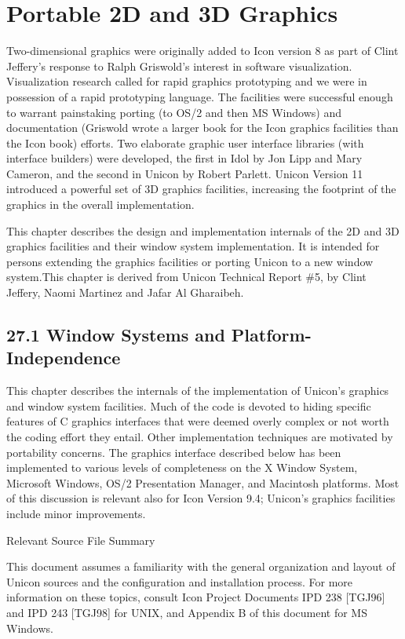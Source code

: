 \chapter{Portable 2D and 3D Graphics}

Two-dimensional graphics were originally added to Icon version 8 as
part of Clint Jeffery's response to Ralph Griswold's interest in
software visualization. Visualization research called for rapid
graphics prototyping and we were in possession of a rapid prototyping
language. The facilities were successful enough to warrant painstaking
porting (to OS/2 and then MS Windows) and documentation (Griswold wrote
a larger book for the Icon graphics facilities than the Icon book) efforts.
Two elaborate graphic user interface libraries (with interface
builders) were developed, the first in Idol by Jon Lipp and Mary
Cameron, and the second in Unicon by Robert Parlett.
Unicon Version 11 introduced a powerful set of 3D graphics facilities,
increasing the footprint of the graphics in the overall implementation.

This chapter describes the design and implementation internals of the
2D and 3D graphics facilities and their window system
implementation. It is intended for persons extending the graphics
facilities or porting Unicon to a new window system.This chapter is
derived from Unicon Technical Report \#5, by Clint Jeffery, Naomi
Martinez and Jafar Al Gharaibeh.


\section[27.1 Window Systems and Platform-Independence]{27.1 Window Systems and Platform-Independence}

This chapter describes the internals of the implementation of Unicon's
graphics and window system facilities. Much of the code is devoted to
hiding specific features of C graphics interfaces that were deemed
overly complex or not worth the coding effort they entail. Other
implementation techniques are motivated by portability concerns. The
graphics interface described below has been implemented to various
levels of completeness on the X Window System, Microsoft Windows, OS/2
Presentation Manager, and Macintosh platforms. Most of this discussion
is relevant also for Icon Version 9.4; Unicon's graphics facilities
include minor improvements.

{\sffamily
Relevant Source File Summary}

This document assumes a familiarity with the general organization and
layout of Unicon sources and the configuration and installation
process. For more information on these topics, consult Icon Project
Documents IPD 238 [TGJ96] and IPD 243 [TGJ98] for UNIX, and Appendix B
of this document for MS Windows.

